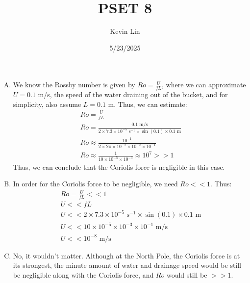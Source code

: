 \documentclass[11pt,a4paper,margin=1in]{article}
\title{PSET 8}
\author{Kevin Lin}
\date{5/23/2025}
\begin{document}
\maketitle
\section{}
\begin{enumerate}[A.]
    \item 
    We know the Rossby number is given by $Ro = \frac{U}{fL}$, where we can
    approximate $U = 0.1$ m/s, the speed of the water draining out of the bucket,
    and for simplicity, also assume $L = 0.1$ m. Thus, we can estimate:
    \begin{gather*}
        Ro = \frac{U}{fL} \\
        Ro = \frac{0.1 \text{ m/s}}{2 \times 7.3 \times 10^{-5} \text{ s}^{-1} 
            \times \sin(0.1) \times 0.1 \text{ m}} \\
        Ro \approx \frac{10^{-1}}{2 \times 2\pi \times 10^{-5} \times 10^{-3}
            \times 10^{-1}} \\
        Ro \approx \frac{1}{10 \times 10^{-5} \times 10^{-3}} \approx 10^7 >> 1
    \end{gather*}
    Thus, we can conclude that the Coriolis force is negligible in this case.
    \item 
    In order for the Coriolis force to be negligible, we need $Ro << 1$. Thus:
    \begin{gather*}
        Ro = \frac{U}{fL} << 1 \\
        U << fL \\
        U << 2 \times 7.3 \times 10^{-5} \text{ s}^{-1} \times \sin(0.1) 
            \times 0.1 \text{ m} \\
        U << 10 \times 10^{-5} \times 10^{-3} \times 10^{-1} \text{ m/s} \\
        U << 10^{-8} \text{ m/s}
    \end{gather*}
    \item 
    No, it wouldn't matter. Although at the North Pole, the Coriolis force is 
    at its strongest, the minute amount of water and drainage speed would be
    still be negligible along with the Coriolis force, and $Ro$ would still be
    $>> 1$.
\end{enumerate}
\end{document}
